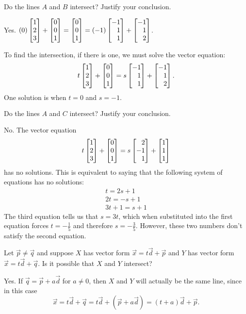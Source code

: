 \documentclass{problemset}
\begin{document}
	\begin{parts}
		\item Do the lines $A$ and $B$ intersect? Justify your conclusion.
			\begin{solution}
				Yes. $(0)\mat{1\\2\\3}+\mat{0\\0\\1} = \mat{0\\0\\1} = (-1)\mat{-1\\1\\1}+\mat{-1\\1\\2}$.

				To find the intersection, if there is one, we must solve the vector equation:
				\[
					t\mat{1\\2\\3}+\mat{0\\0\\1} = s\mat{-1\\1\\1}+\mat{-1\\1\\2}.
				\]
				One solution is when $t = 0$ and $s = -1$.
			\end{solution}
		\item Do the lines $A$ and $C$ intersect? Justify your conclusion.
			\begin{solution}
				No. The vector equation
				\[
					t\mat{1\\2\\3}+\mat{0\\0\\1} = s\mat{2\\-1\\1}+\mat{1\\1\\1}
				\]
				has no solutions. This is equivalent to saying that the following
				system of equations has no solutions:
				\begin{gather*}
					t = 2s + 1 \\
					2t = -s + 1 \\
					3t + 1 = s + 1
				\end{gather*}
				The third equation tells us that $s = 3t$, which when substituted
				into the first equation forces $t = -\tfrac{1}{5}$ and therefore
				$s = -\tfrac{3}{5}$. However, these two numbers don't satisfy the second
				equation.
			\end{solution}
		\item Let $\vec p\neq \vec q$ and suppose
			$X$ has vector form $\vec x=t\vec d+\vec p$ and $Y$ has
			vector form $\vec x=t\vec d+\vec q$. Is it possible
			that $X$ and $Y$ intersect?
			\begin{solution}
				Yes. If $\vec q=\vec p+a\vec d$ for $a\neq 0$, then $X$ and $Y$
				will actually be the same line, since in this case
				\[
					\vec x = t\vec d+\vec q
					= t\vec d+(\vec p+a\vec d)
					= (t+a)\vec d+\vec p.
				\]


\end{solution}
\end{parts}
\end{document}
